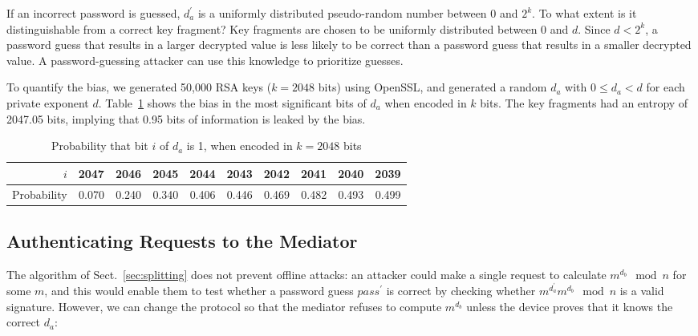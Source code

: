 \documentclass{llncs}
\begin{document}
If an incorrect password is guessed, $d_a^\prime$ is a uniformly distributed pseudo-random number
between 0 and $2^k$. To what extent is it distinguishable from a correct key fragment? Key fragments
are chosen to be uniformly distributed between 0 and $d$. Since $d < 2^k$, a password guess that
results in a larger decrypted value is less likely to be correct than a password guess that results
in a smaller decrypted value. A password-guessing attacker can use this knowledge to prioritize
guesses.

To quantify the bias, we generated 50,000 RSA keys ($k=2048$ bits) using OpenSSL, and generated a
random $d_a$ with $0 \le d_a < d$ for each private exponent $d$. Table~\ref{tab:bias} shows the bias
in the most significant bits of $d_a$ when encoded in $k$ bits. The key fragments had an entropy of
2047.05 bits, implying that 0.95 bits of information is leaked by the bias.

\renewcommand{\arraystretch}{1.5}
\setlength\tabcolsep{4pt}
\begin{table}
\centering
\caption{Probability that bit $i$ of $d_a$ is 1, when encoded in $k=2048$ bits}\label{tab:bias}
\begin{tabular}{r|rrrrrrrrr}
$i$ & 2047 & 2046 & 2045 & 2044 & 2043 & 2042 & 2041 & 2040 & 2039 \\ \hline
Probability &
0.070 & 0.240 & 0.340 & 0.406 & 0.446 & 0.469 & 0.482 & 0.493 & 0.499
\end{tabular}
\end{table}

\subsection{Authenticating Requests to the Mediator}\label{sec:mediator-auth}

The algorithm of Sect.~\ref{sec:splitting} does not prevent offline attacks: an attacker could make
a single request to calculate $m^{d_b} \mod n$ for some $m$, and this would enable them to test
whether a password guess $\mathit{pass}^\prime$ is correct by checking whether
$m^{d_a^\prime} m^{d_b} \mod n$ is a valid signature. However, we can change the protocol so that
the mediator refuses to compute $m^{d_b}$ unless the device proves that it knows the correct $d_a$:
\end{document}

